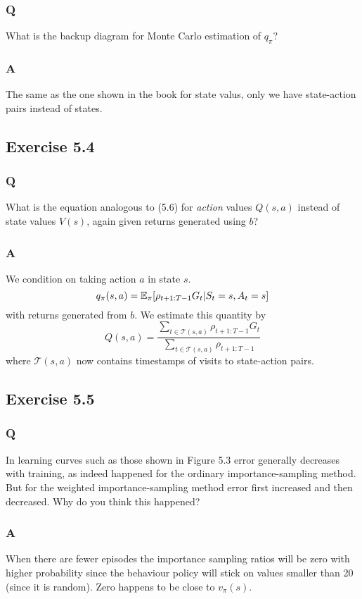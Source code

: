 \subsubsection{Q}
What is the backup diagram for Monte Carlo estimation of $q_\pi$?

\subsubsection{A}
The same as the one shown in the book for state valus, only we have state-action pairs instead of states.

\subsection{Exercise 5.4}
\subsubsection{Q}
What is the equation analogous to (5.6) for \emph{action} values $Q(s, a)$ instead of state values $V(s)$, again given returns generated using $b$?
\subsubsection{A}
We condition on taking action $a$ in state $s$.
\[
    q_\pi(s, a) = \mathbb{E}_\pi{}[\rho_{t+1:T-1} G_t | S_t = s, A_t = s]
\]
with returns generated from $b$. We estimate this quantity by
\[
    Q(s, a) = \frac{\sum_{t \in \mathcal{T}(s, a)} \rho_{t+1:T-1} G_t}{\sum_{t \in \mathcal{T}(s, a)} \rho_{t+1:T-1}}
\]
where $\mathcal{T}(s, a)$ now contains timestamps of visits to state-action pairs.

\subsection{Exercise 5.5}
\subsubsection{Q}
In learning curves such as those shown in Figure 5.3 error generally decreases with training, as indeed happened for the ordinary importance-sampling method. But for the weighted importance-sampling method error first increased and then decreased. Why do you think this happened?

\subsubsection{A}
When there are fewer episodes the importance sampling ratios will be zero with higher probability since the behaviour policy will stick on values smaller than 20 (since it is random). Zero happens to be close to $v_\pi(s)$.\\

